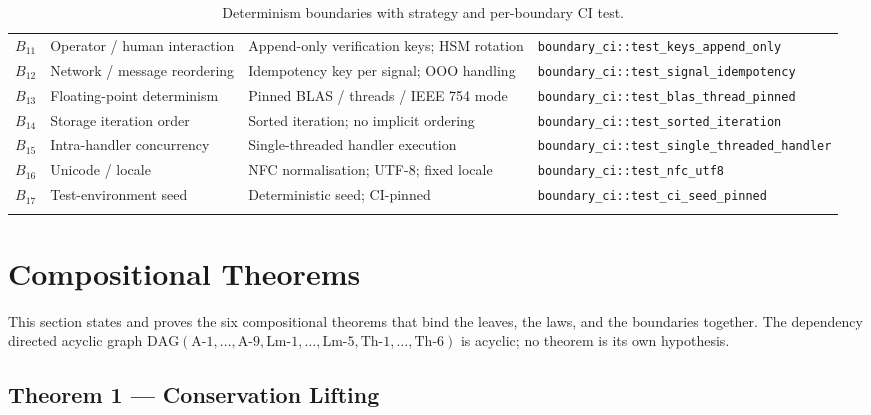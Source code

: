 \documentclass[11pt,a4paper]{article}
\begin{document}
\begin{center}
\begin{longtable}{@{}p{0.8cm}p{4.5cm}p{5.5cm}p{5.0cm}@{}}
$B_{11}$ & Operator / human interaction          & Append-only verification keys; HSM rotation    & \texttt{boundary\_ci::test\_keys\_append\_only} \\
$B_{12}$ & Network / message reordering          & Idempotency key per signal; OOO handling       & \texttt{boundary\_ci::test\_signal\_idempotency} \\
$B_{13}$ & Floating-point determinism            & Pinned BLAS / threads / IEEE 754 mode          & \texttt{boundary\_ci::test\_blas\_thread\_pinned} \\
$B_{14}$ & Storage iteration order               & Sorted iteration; no implicit ordering         & \texttt{boundary\_ci::test\_sorted\_iteration} \\
$B_{15}$ & Intra-handler concurrency             & Single-threaded handler execution              & \texttt{boundary\_ci::test\_single\_threaded\_handler} \\
$B_{16}$ & Unicode / locale                      & NFC normalisation; UTF-8; fixed locale         & \texttt{boundary\_ci::test\_nfc\_utf8} \\
$B_{17}$ & Test-environment seed                 & Deterministic seed; CI-pinned                  & \texttt{boundary\_ci::test\_ci\_seed\_pinned} \\
\caption{Determinism boundaries with strategy and per-boundary CI test.}
\label{tab:boundaries}
\end{longtable}
\end{center}

\clearpage
\section{Compositional Theorems}
\label{sec:theorems}

This section states and proves the six compositional theorems that bind the leaves, the laws, and the boundaries together. The dependency directed acyclic graph $\mathrm{DAG}(\text{A-1},\dots,\text{A-9}, \text{Lm-1},\dots,\text{Lm-5}, \mathrm{Th}\textrm{-}1,\dots,\mathrm{Th}\textrm{-}6)$ is acyclic; no theorem is its own hypothesis.

\subsection{Theorem 1 --- Conservation Lifting}
\label{sec:thm-conservation}
\end{document}
